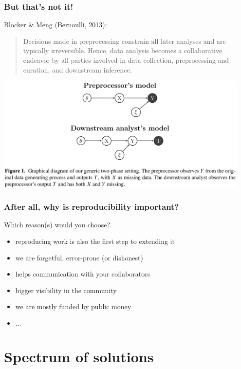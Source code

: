 \documentclass[c]{beamer} %
\begin{document}
\begin{frame}
  \frametitle{But that's not it!}
  \small
  Blocker \& Meng (\href{http://dx.doi.org/10.3150/13-bejsp16}{Bernoulli, 2013}):
  \begin{quote}
    Decisions made in preprocessing constrain all later analyses and are typically irreversible. Hence, data analysis becomes a collaborative endeavor by all parties involved in data collection, preprocessing and curation, and downstream inference.
  \end{quote}
  \normalsize
  
  \begin{center}
    \includegraphics[width=0.95\textwidth,height=0.90\textheight,keepaspectratio=true,clip=true,trim=0 120 0 0]{blocker_13_preprocessing_fig1}%
  \end{center}
\end{frame}

\begin{frame}
  \frametitle{After all, why is reproducibility important?}
  Which reason(s) would you choose?
  \bigskip
  \pause
  \begin{itemize}
  \item reproducing work is also the first step to extending it
    \medskip
  \item we are forgetful, error-prone (or dishonest)
    \medskip
  \item helps communication with your collaborators
    \medskip
  \item bigger visibility in the community
    \medskip
  \item we are mostly funded by public money
    \medskip
  \item ...
  \end{itemize}
\end{frame}

\section{Spectrum of solutions}
\end{document}
